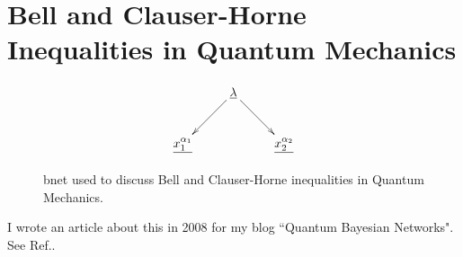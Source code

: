 \chapter{Bell  
and Clauser-Horne Inequalities 
in Quantum Mechanics}

\begin{figure}[h!]
\centering
$$\xymatrix{
&\ul{\lambda}\ar[dr]\ar[dl]&\\
\ul{x_1^{\alpha_1}}&&\ul{x_2^{\alpha_2}}
}$$
\caption{bnet used to discuss Bell 
and Clauser-Horne inequalities 
in Quantum Mechanics.}
\label{fig-bell}
\end{figure}

I wrote an article about
this in 2008 for
my blog ``Quantum Bayesian Networks". 
See Ref.\cite{bell-blog}.